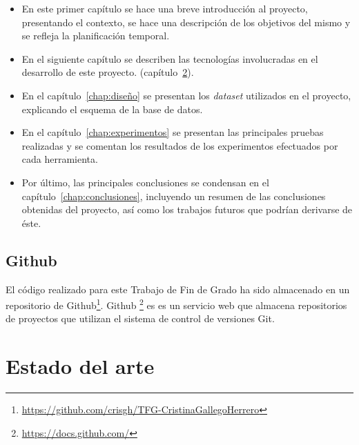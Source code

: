 \documentclass[a4paper, 12pt]{book}
\begin{document}
    \begin{itemize}
      \item En este primer capítulo se hace una breve introducción al proyecto, presentando el contexto, se hace una descripción de los objetivos del mismo y se refleja la planificación temporal.
      \item En el siguiente capítulo se describen las tecnologías involucradas en el desarrollo de este proyecto. (capítulo~\ref{chap:tecnologias}).
      \item En el capítulo~\ref{chap:diseño} se presentan los \textit{dataset} utilizados en el proyecto, explicando el esquema de la base de datos. 
      \item En el capítulo~\ref{chap:experimentos} se presentan las principales pruebas realizadas y se comentan los resultados de los experimentos
      efectuados por cada herramienta. 
      \item Por último, las principales conclusiones se condensan en el capítulo~\ref{chap:conclusiones}, incluyendo un resumen de las conclusiones obtenidas del proyecto, así como los trabajos futuros que podrían derivarse de éste.
    \end{itemize}


\section{Github}
\label{sec:github}

El código realizado para este Trabajo de Fin de Grado ha sido almacenado en un repositorio de Github\footnote{\url{https://github.com/crisgh/TFG-CristinaGallegoHerrero}}. Github \footnote{\url{https://docs.github.com/}} es es un servicio web que almacena repositorios de proyectos que utilizan el sistema de control de versiones Git.


\clearpage


\chapter{Estado del arte}               %
\label{chap:tecnologias}
\end{document}
